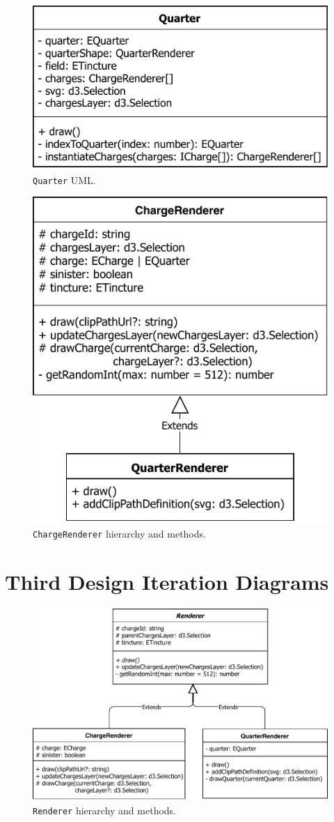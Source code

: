 \begin{figure}[h]
  \includegraphics[width=0.5\linewidth]{QuarterUML}
  \caption{\texttt{Quarter} UML.}%
  \label{fig:QuarterUML}
\end{figure}

\begin{figure}[h]
  \includegraphics[width=0.5\linewidth]{ChargeRendererUML}%
  \caption{\texttt{ChargeRenderer} hierarchy and methods.}%
  \label{fig:charge_renderer_heirarchy}
\end{figure}

\pagebreak%

\section{Third Design Iteration Diagrams}%
\label{sec:third_design_iteration_diagrams}

\begin{figure}[h]
  \includegraphics[width=0.8\linewidth]{RendererUML}
  \caption{\texttt{Renderer} hierarchy and methods.}%
  \label{fig:RendererUML}
\end{figure}

